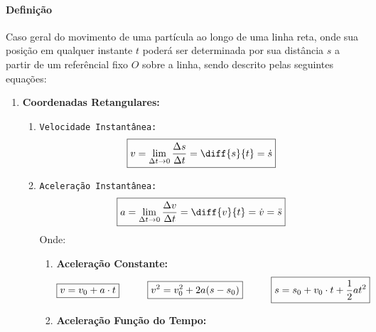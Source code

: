 \documentclass{article}
\begin{document}
            \paragraph{Definição}Caso geral do movimento de uma partícula ao longo de uma linha reta, onde sua posição em qualquer instante $t$ poderá ser determinada por sua distância $s$ a partir de um referêncial fixo $O$ sobre a linha, sendo descrito pelas seguintes equações:
                \begin{enumerate}[noitemsep]
                    \item \textbf{Coordenadas Retangulares:}
                        \begin{enumerate}[noitemsep]
                            \item \texttt{Velocidade Instantânea:}
                                \begin{equation}
                                    \boxed{
                                        v = \lim_{\Delta t \to 0} \frac{\Delta s}{\Delta t} = \diff{s}{t} =\dot{s}
                                    }
                                \end{equation}
                            \item \texttt{Aceleração Instantânea:}
                                \begin{equation}
                                    \boxed{
                                        a = \lim_{\Delta t \to 0} \frac{\Delta v}{\Delta t} = \diff{v}{t} =\dot{v} = \ddot{s}
                                    }
                                \end{equation}
                            Onde:
                                \begin{enumerate}[noitemsep]
                                    \item \textbf{Aceleração Constante:}
                                        \[
                                            \boxed{v = v_{0} + a \cdot t}
                                            \hspace{10mm}
                                            \boxed{v^{2} = v_{0}^{2} + 2 a (s - s_{0})}
                                            \hspace{10mm}
                                            \boxed{s = s_{0} + v_{0} \cdot t + \frac{1}{2} a t^{2}}
                                        \]
                                    \item \textbf{Aceleração Função do Tempo:}

\end{enumerate}
\end{enumerate}
\end{enumerate}
\end{document}
